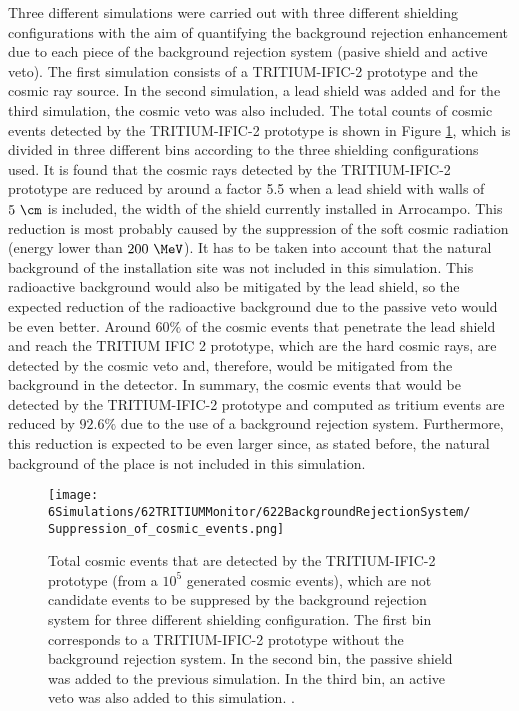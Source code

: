 Three different simulations were carried out with three different shielding configurations with the aim of quantifying the background rejection enhancement due to each piece of the background rejection system (pasive shield and active veto). The first simulation consists of a TRITIUM-IFIC-2 prototype and the cosmic ray source. In the second simulation, a lead shield was added and for the third simulation, the cosmic veto was also included. The total counts of cosmic events detected by the TRITIUM-IFIC-2 prototype is shown in Figure \ref{fig:CosmicEventsSuppressionSimulated}, which is divided in three different bins according to the three shielding configurations used. It is found that the cosmic rays detected by the TRITIUM-IFIC-2 prototype are reduced by around a factor 5.5 when a lead shield with walls of $5~\cm$ is included, the width of the shield currently installed in Arrocampo. This reduction is most probably caused by the suppression of the soft cosmic radiation (energy lower than $200~\MeV$). It has to be taken into account that the natural background of the installation site was not included in this simulation. This radioactive background would also be mitigated by the lead shield, so the expected reduction of the radioactive background due to the passive veto would be even better. Around $60\%$ of the cosmic events that penetrate the lead shield and reach the TRITIUM IFIC 2 prototype, which are the hard cosmic rays, are detected by the cosmic veto and, therefore, would be mitigated from the background in the detector. In summary, the cosmic events that would be detected by the TRITIUM-IFIC-2 prototype and computed as tritium events are reduced by $92.6\%$ due to the use of a background rejection system. Furthermore, this reduction is expected to be even larger since, as stated before, the natural background of the place is not included in this simulation.

\begin{figure}[h]
\texttt{[image: 6Simulations/62TRITIUMMonitor/622BackgroundRejectionSystem/Suppression\_of\_cosmic\_events.png]}
\centering
\caption{Total cosmic events that are detected by the TRITIUM-IFIC-2 prototype (from a $10^5$ generated cosmic events), which are not candidate events to be suppresed by the background rejection system for three different shielding configuration. The first bin corresponds to a TRITIUM-IFIC-2 prototype without the background rejection system. In the second bin, the passive shield was added to the previous simulation. In the third bin, an active veto was also added to this simulation.  \label{fig:CosmicEventsSuppressionSimulated}.}
\end{figure}